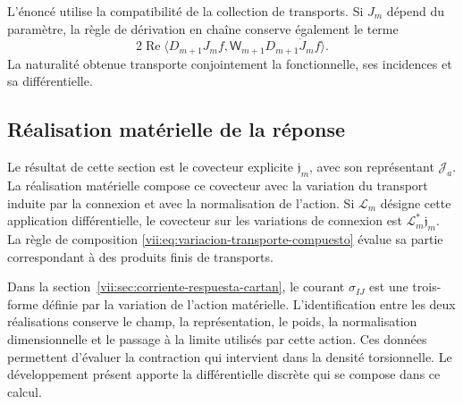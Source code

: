 L'énoncé utilise la compatibilité de la collection de transports. Si \(J_m\) dépend du paramètre, la règle de dérivation en chaîne conserve également le terme
\[
 2\operatorname{Re}
 \langle D_{m+1}J_mf,\mathsf W_{m+1}D_{m+1}\dot J_mf\rangle.
\]
La naturalité obtenue transporte conjointement la fonctionnelle, ses
incidences et sa différentielle.

\subsection{Réalisation matérielle de la réponse}
\label{vii:subsec:realizacion-respuesta-discreta}

Le résultat de cette section est le covecteur explicite
\(\mathfrak j_m\), avec son représentant \(\mathcal J_a\).
La réalisation matérielle compose ce covecteur avec la variation du
transport induite par la connexion et avec la normalisation de l'action.
Si \(\mathcal L_m\) désigne cette application différentielle, le covecteur sur
les variations de connexion est \(\mathcal L_m^*\mathfrak j_m\).
La règle de composition
\eqref{vii:eq:variacion-transporte-compuesto} évalue sa partie
correspondant à des produits finis de transports.

Dans la section~\ref{vii:sec:corriente-respuesta-cartan}, le courant
\(\sigma_{IJ}\) est une trois-forme définie par la variation de l'action
matérielle. L'identification entre les deux réalisations conserve le champ,
la représentation, le poids, la normalisation dimensionnelle et le passage à la
limite utilisés par cette action. Ces données permettent d'évaluer la
contraction qui intervient dans la densité torsionnelle. Le développement
présent apporte la différentielle discrète qui se compose dans ce calcul.
